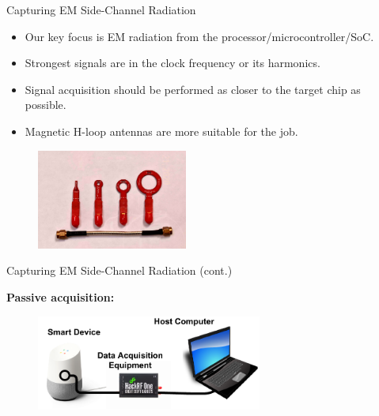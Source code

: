 \documentclass[handout]{beamer}
\begin{document}
\begin{frame}{Capturing EM Side-Channel Radiation}  

	\begin{itemize}
	\footnotesize
	\item Our key focus is EM radiation from the processor/microcontroller/SoC.
		\vspace{5pt}
	\item Strongest signals are in the clock frequency or its harmonics.
		\vspace{5pt}
	\item Signal acquisition should be performed as closer to the target chip as possible.
		\vspace{5pt}
	\item Magnetic H-loop antennas are more suitable for the job.
	\end{itemize}


	\begin{figure}
		\includegraphics[width=140pt]{figures/antenna-kit-small.jpg}
	\end{figure}

\end{frame}



\begin{frame}{Capturing EM Side-Channel Radiation (cont.)}  

\footnotesize
\textbf{Passive acquisition:}

	\begin{figure}
		\includegraphics[width=210pt]{figures/hardware-setup.pdf}
	\end{figure}

\end{frame}
\end{document}
